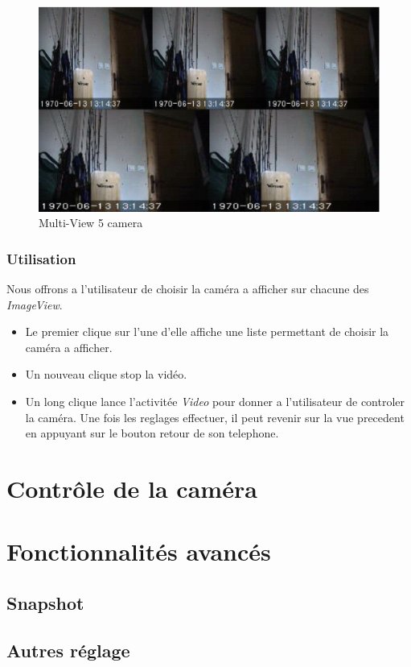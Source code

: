 \begin{figure}[H]
  \label{DiagrammeSequenceMultiView}
  \centering
   \includegraphics[scale=0.4]{Images/5cam.eps}
  \caption{Multi-View 5 camera}
\end{figure}  
\subsubsection{Utilisation}
Nous offrons a l'utilisateur de choisir la caméra a afficher sur chacune des
\textit{ImageView}. 
\begin{itemize}
\item Le premier clique sur l'une d'elle affiche une liste permettant de
choisir la caméra a afficher.
\item Un nouveau clique stop la vidéo.
\item Un long clique lance l'activitée \textit{Video} pour donner a
l'utilisateur de controler la caméra. Une fois les reglages effectuer, il peut
revenir sur la vue precedent en appuyant sur le bouton retour de son telephone.
\end{itemize}

\section{Contrôle de la caméra}

\section{Fonctionnalités avancés}
\subsection{Snapshot}

\subsection{Autres réglage}


